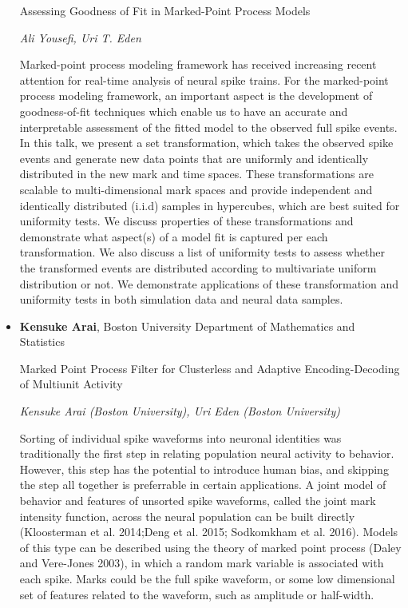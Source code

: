 \begin{itemize}
Assessing Goodness of Fit in Marked-Point Process Models

\emph{\footnotesize Ali Yousefi, Uri T. Eden}

Marked-point process modeling framework has received increasing recent attention for real-time analysis of neural spike trains. For the marked-point process modeling framework, an important aspect is the development of goodness-of-fit techniques which enable us to have an accurate and interpretable assessment of the fitted model to the observed full spike events. In this talk, we present a set transformation, which takes the observed spike events and generate new data points that are uniformly and identically distributed in the new mark and time spaces. These transformations are scalable to multi-dimensional mark spaces and provide independent and identically distributed (i.i.d) samples in hypercubes, which are best suited for uniformity tests. We discuss properties of these transformations and demonstrate what aspect(s) of a model fit is captured per each transformation. We also discuss a list of uniformity tests to assess whether the transformed events are distributed according to multivariate uniform distribution or not. We demonstrate applications of these transformation and uniformity tests in both simulation data and neural data samples.

\item \textbf{Kensuke Arai}, Boston University Department of Mathematics and Statistics

Marked Point Process Filter for Clusterless and Adaptive Encoding-Decoding of Multiunit Activity

\emph{\footnotesize Kensuke Arai (Boston University), Uri Eden (Boston University)}

Sorting of individual spike waveforms into neuronal identities was traditionally the first step in relating population neural activity to behavior.  However, this step has the potential to introduce human bias, and skipping the step all together is preferrable in certain applications. A joint model of behavior and features of unsorted spike waveforms, called the joint mark intensity function, across the neural population can be built directly (Kloosterman et al. 2014;Deng et al. 2015; Sodkomkham et al. 2016).  Models of this type can be described using the theory of marked point process (Daley and Vere-Jones 2003), in which a random mark variable is associated with each spike.  Marks could be the full spike waveform, or some low dimensional set of features related to the waveform, such as amplitude or half-width. 


\end{itemize}
